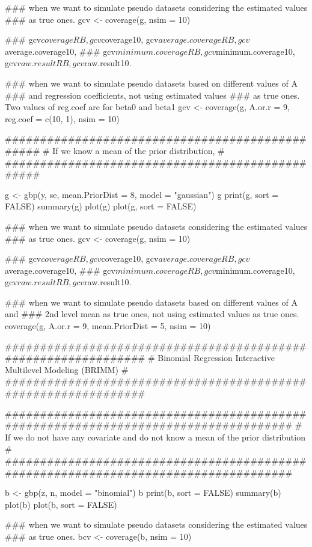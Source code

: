 \documentclass[a4paper]{book}
\begin{document}
\begin{Examples}
\begin{ExampleCode}
    ### when we want to simulate pseudo datasets considering the estimated values 
    ### as true ones.
    gcv <- coverage(g, nsim = 10)  
 
    ### gcv$coverageRB, gcv$coverage10, gcv$average.coverageRB, gcv$average.coverage10,
    ### gcv$minimum.coverageRB, gcv$minimum.coverage10, gcv$raw.resultRB, gcv$raw.result10.

    ### when we want to simulate pseudo datasets based on different values of A
    ### and regression coefficients, not using estimated values 
    ### as true ones. Two values of reg.coef are for beta0 and beta1
    gcv <- coverage(g, A.or.r = 9, reg.coef = c(10, 1), nsim = 10)  

    ################################################
    # If we know a mean of the prior distribution, #
    ################################################

    g <- gbp(y, se, mean.PriorDist = 8, model = "gaussian")
    g
    print(g, sort = FALSE)
    summary(g)
    plot(g)
    plot(g, sort = FALSE)

    ### when we want to simulate pseudo datasets considering the estimated values 
    ### as true ones.
    gcv <- coverage(g, nsim = 10)  

    ### gcv$coverageRB, gcv$coverage10, gcv$average.coverageRB, gcv$average.coverage10,
    ### gcv$minimum.coverageRB, gcv$minimum.coverage10, gcv$raw.resultRB, gcv$raw.result10.

    ### when we want to simulate pseudo datasets based on different values of A and
    ### 2nd level mean as true ones, not using estimated values as true ones.
    coverage(g, A.or.r = 9, mean.PriorDist = 5, nsim = 10)  

  ###############################################################
  # Binomial Regression Interactive Multilevel Modeling (BRIMM) #
  ###############################################################

    ####################################################################################
    # If we do not have any covariate and do not know a mean of the prior distribution #
    ####################################################################################

    b <- gbp(z, n, model = "binomial")
    b
    print(b, sort = FALSE)
    summary(b)
    plot(b)
    plot(b, sort = FALSE)

    ### when we want to simulate pseudo datasets considering the estimated values 
    ### as true ones.
    bcv <- coverage(b, nsim = 10)  


\end{ExampleCode}
\end{Examples}
\end{document}

